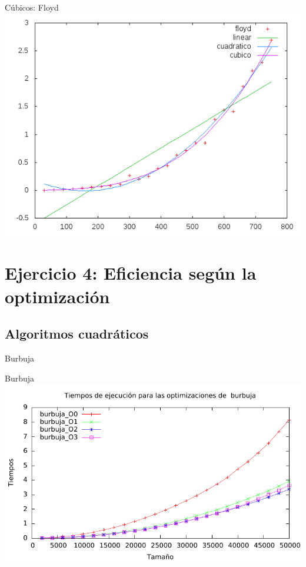 \documentclass[10pt,compress,usetitleprogressbar,mathserif]{beamer}
\begin{document}
\begin{frame}{Cúbicos: Floyd}
	\includegraphics[width = \textwidth ]{img/floyd_hibrida.pdf}
\end{frame}

\section{Ejercicio 4: \large{Eficiencia según la optimización }}

\subsection{Algoritmos cuadráticos}

\begin{frame}{Burbuja}
	
\end{frame}

\begin{frame}{Burbuja}
	\includegraphics[width = \textwidth ]{img/burbuja_optim_g.pdf}
\end{frame}
\end{document}
